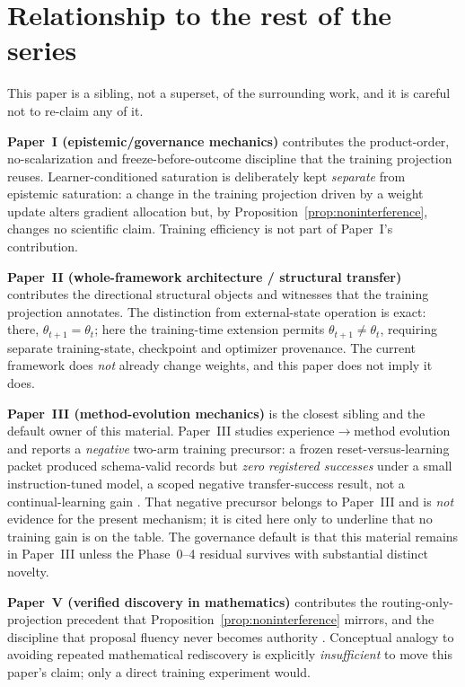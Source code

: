 \documentclass[11pt]{article}
\begin{document}
\section{Relationship to the rest of the series}
\label{sec:series}

This paper is a sibling, not a superset, of the surrounding work, and it is careful not to re-claim any of it.

\textbf{Paper~I (epistemic/governance mechanics)} contributes the product-order, no-scalarization and freeze-before-outcome discipline that the training projection reuses. Learner-conditioned saturation is deliberately kept \emph{separate} from epistemic saturation: a change in the training projection driven by a weight update alters gradient allocation but, by Proposition~\ref{prop:noninterference}, changes no scientific claim. Training efficiency is not part of Paper~I's contribution.

\textbf{Paper~II (whole-framework architecture / structural transfer)} contributes the directional structural objects and witnesses that the training projection annotates. The distinction from external-state operation is exact: there, $\theta_{t+1}=\theta_t$; here the training-time extension permits $\theta_{t+1}\neq\theta_t$, requiring separate training-state, checkpoint and optimizer provenance. The current framework does \emph{not} already change weights, and this paper does not imply it does.

\textbf{Paper~III (method-evolution mechanics)} is the closest sibling and the default owner of this material. Paper~III studies experience$\to$method evolution and reports a \emph{negative} two-arm training precursor: a frozen reset-versus-learning packet produced schema-valid records but \emph{zero registered successes} under a small instruction-tuned model, a scoped negative transfer-success result, not a continual-learning gain \cite{yiu2026verified}. That negative precursor belongs to Paper~III and is \emph{not} evidence for the present mechanism; it is cited here only to underline that no training gain is on the table. The governance default is that this material remains in Paper~III unless the Phase~0--4 residual survives with substantial distinct novelty.

\textbf{Paper~V (verified discovery in mathematics)} contributes the routing-only-projection precedent that Proposition~\ref{prop:noninterference} mirrors, and the discipline that proposal fluency never becomes authority \cite{yiu2026verified}. Conceptual analogy to avoiding repeated mathematical rediscovery is explicitly \emph{insufficient} to move this paper's claim; only a direct training experiment would.
\end{document}
